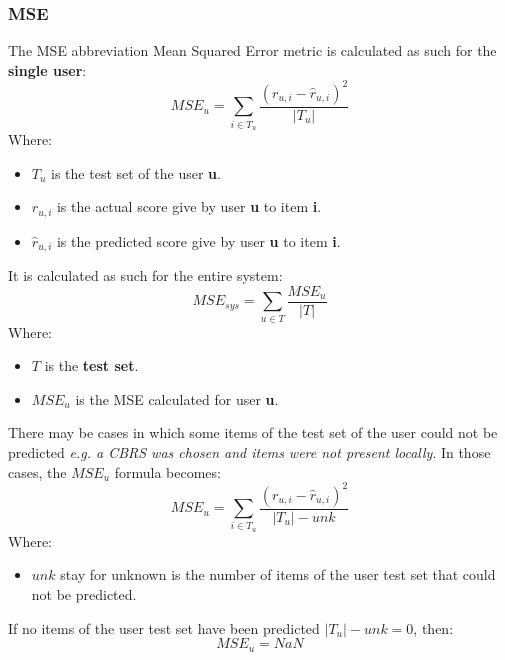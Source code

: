 \subsubsection{MSE}\label{subsubsec:mse}
The MSE abbreviation Mean Squared Error metric is calculated as such for the \textbf{single user}:
\hfill\break
\hfill\break
    \[
        MSE_u = \sum_{i \in T_u} \frac{(r_{u,i} - \hat{r}_{u,i})^2}{|T_u|}
    \]
\hfill\break
\hfill\break
    Where:
\begin{itemize}
    \item $T_u$ is the test set of the user \textbf{u}.
    \item $r_{u, i}$ is the actual score give by user \textbf{u} to item \textbf{i}.
    \item $\hat{r}_{u, i}$ is the predicted score give by user \textbf{u} to item \textbf{i}.
\end{itemize}
\hfill\break
\hfill\break
It is calculated as such for the entire system:
\hfill\break
\hfill\break
    \[
        MSE_{sys} = \sum_{u \in T} \frac{MSE_u}{|T|}
    \]
\hfill\break
\hfill\break
    Where:
\begin{itemize}
    \item $T$ is the \textbf{test set}.
    \item $MSE_u$ is the MSE calculated for user \textbf{u}.
\end{itemize}
\hfill\break
\hfill\break
There may be cases in which some items of the test set of the user could not be predicted
\textit{e.g. a CBRS was chosen and items were not present locally}.
In those cases, the $MSE_u$ formula becomes:
\hfill\break
\hfill\break
    \[
        MSE_u = \sum_{i \in T_u} \frac{(r_{u,i} - \hat{r}_{u,i})^2}{|T_u| - unk}
    \]
\hfill\break
\hfill\break
    Where:
\begin{itemize}
    \item $unk$ stay for unknown is the number of items of the user test set that could not be predicted.
\end{itemize}
\hfill\break
\hfill\break
If no items of the user test set have been predicted $|T_u| - unk = 0$, then:
\hfill\break
\hfill\break
    \[
        MSE_u = NaN
    \]
\hfill\break
\hfill\break

